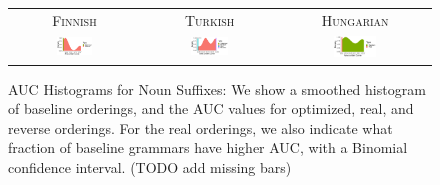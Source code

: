 \documentclass[11pt,letterpaper]{article}
\newcommand\mhahn[1]{{\color{red}(#1)}}
\begin{document}
\begin{figure}
\begin{tabular}{ccc}
\textsc{Finnish} & \textsc{Turkish} & \textsc{Hungarian} \\
    \includegraphics[width=0.3\textwidth]{figures/finnish_nouns/suffixes-byMorphemes-auc-hist-heldout-Coarse-FineSurprisal-optimized.pdf}
    &
    \includegraphics[width=0.3\textwidth]{figures/turkish_nouns/suffixes-byMorphemes-auc-hist-heldout-Coarse-FineSurprisal-optimized.pdf}
    &
    \includegraphics[width=0.3\textwidth]{figures/hungarian_nouns/suffixes-byMorphemes-auc-hist-heldout-Coarse-FineSurprisal-optimized.pdf}
    \end{tabular}
    \caption{AUC Histograms for Noun Suffixes: We show a smoothed histogram of baseline orderings, and the AUC values for optimized, real, and reverse orderings. For the real orderings, we also indicate what fraction of baseline grammars have higher AUC, with a Binomial confidence interval. \mhahn{TODO add missing bars}}
    \label{fig:auc_nouns}
\end{figure}
\end{document}
